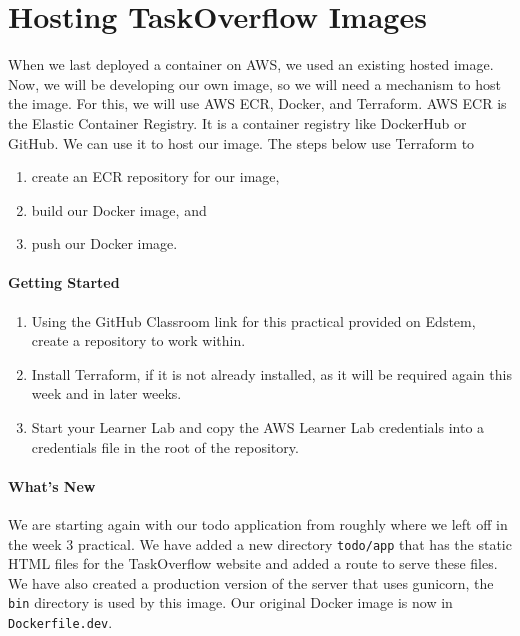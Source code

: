 \documentclass{csse4400}
\begin{document}
\section{Hosting TaskOverflow Images}

When we last deployed a container on AWS, we used an existing hosted image.
Now, we will be developing our own image, so we will need a mechanism to host the image.
For this, we will use AWS ECR, Docker, and Terraform.
AWS ECR is the Elastic Container Registry.
It is a container registry like DockerHub or GitHub.
We can use it to host our image.
The steps below use Terraform to

\begin{enumerate}
    \item create an ECR repository for our image,
    \item build our Docker image, and
    \item push our Docker image.
\end{enumerate}


\paragraph{Getting Started}

\begin{enumerate}
    \item Using the GitHub Classroom link for this practical provided on Edstem, create a repository to work within.
    \item Install Terraform, if it is not already installed, as it will be required again this week and in later weeks.
    \item Start your Learner Lab and copy the AWS Learner Lab credentials into a credentials file in the root of the repository.
\end{enumerate}

\paragraph{What's New}
We are starting again with our todo application from roughly where we left off in the week 3 practical.
We have added a new directory \texttt{todo/app} that has the static HTML files for the TaskOverflow website and added a route to serve these files.
We have also created a production version of the server that uses gunicorn,
the \texttt{bin} directory is used by this image.
Our original Docker image is now in \texttt{Dockerfile.dev}.\\
\end{document}

